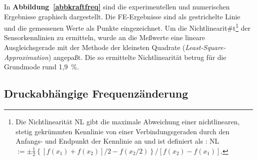 In {\bf Abbildung~\ref{abbkraftfreq}} sind die experimentellen und
numerischen Ergebnisse graphisch dargestellt. Die FE-Ergebnisse sind
als gestrichelte Linie und die gemessenen Werte als Punkte eingezeichnet.
Um die Nichtlinearit#t\footnote{Die Nichtlinearität NL gibt die
maximale Abweichung einer nichtlinearen, stetig gekrümmten Kennlinie
von einer Verbindungsgeraden
durch den Anfangs- und Endpunkt der Kennlinie an und ist
definiert als \cite{Rei89}: NL$ := \pm \frac{1}{2} \left\{
[f(x_{1})+f(x_{2})]/2-f(x_{2}/2) \right\} / [f(x_{2})-f(x_{1})]$.}
der Sensorkennlinien zu ermitteln, wurde
an die Meßwerte eine lineare Ausgleichsgerade mit der Methode
der kleinsten Quadrate ({\em Least-Square-Approximation}) angepaßt. Die
so ermittelte Nichtlinearität betrug für die Grundmode rund 1,9~\%.



\subsection{Druckabhängige Frequenzänderung}
\label{druckabh}

